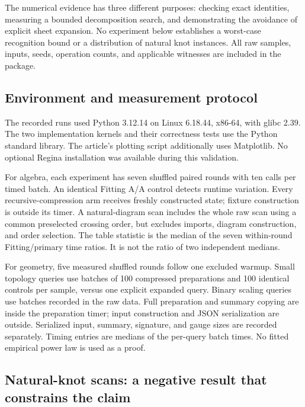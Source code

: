 \documentclass[11pt,a4paper]{article}
\theoremstyle{definition}\newtheorem{definition}[theorem]{Definition}
\theoremstyle{remark}\newtheorem{remark}[theorem]{Remark}
\begin{document}
The numerical evidence has three different purposes: checking exact
identities, measuring a bounded decomposition search, and demonstrating the
avoidance of explicit sheet expansion. No experiment below establishes a
worst-case recognition bound or a distribution of natural knot instances.
All raw samples, inputs, seeds, operation counts, and applicable witnesses
are included in the package.

\subsection{Environment and measurement protocol}

The recorded runs used Python 3.12.14 on Linux 6.18.44, x86-64, with glibc
2.39. The two implementation kernels and their correctness tests use the
Python standard library. The article's plotting script additionally uses
Matplotlib. No optional Regina installation was available during this
validation.

For algebra, each experiment has seven shuffled paired rounds with ten
calls per timed batch. An identical Fitting A/A control detects runtime
variation. Every recursive-compression arm receives freshly constructed
state; fixture construction is outside its timer. A natural-diagram scan
includes the whole raw scan using a common preselected crossing order, but
excludes imports, diagram construction, and order selection. The table
statistic is the median of the seven within-round Fitting/primary time
ratios. It is not the ratio of two independent medians.

For geometry, five measured shuffled rounds follow one excluded warmup.
Small topology queries use batches of 100 compressed preparations and 100
identical controls per sample, versus one explicit expanded query. Binary
scaling queries use batches recorded in the raw data. Full preparation and
summary copying are inside the preparation timer; input construction and
JSON serialization are outside. Serialized input, summary, signature, and
gauge sizes are recorded separately. Timing entries are medians of the
per-query batch times. No fitted empirical power law is used as a proof.

\subsection{Natural-knot scans: a negative result that constrains the claim}


\end{document}
